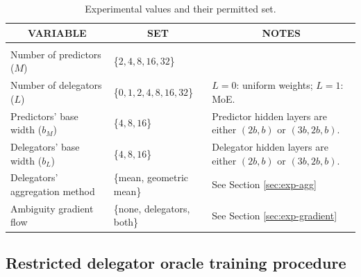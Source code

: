 \documentclass[10pt]{article} %
\begin{document}
\begin{table}[t]
\caption{Experimental values and their permitted set.}
\label{tab:experiment-parameters}
\begin{center}
\begin{tabular}{lll}
\multicolumn{1}{c}{\bf VARIABLE}
&
\multicolumn{1}{c}{\bf SET}
&
\multicolumn{1}{c}{\bf NOTES}
\\ \hline \\
Number of predictors ($M$) & \{$2, 4, 8, 16, 32$\} &  \\
Number of delegators ($L$) & \{$0, 1, 2, 4, 8, 16, 32$\} &  $L=0$: uniform weights; $L=1$: MoE. \\
Predictors' base width ($b_M$) & \{$4, 8, 16$\} & Predictor hidden layers are either $(2b,b)$ or $(3b,2b,b)$.  \\
Delegators' base width ($b_L$) & \{$4, 8, 16$\} & Delegator hidden layers are either $(2b,b)$ or $(3b,2b,b)$. \\
Delegators' aggregation method & \{mean, geometric mean\} & See Section \ref{sec:exp-agg} \\
Ambiguity gradient flow & \{none, delegators, both\} & See Section \ref{sec:exp-gradient} \\
\end{tabular}
\end{center}
\end{table}



\subsection{Restricted delegator oracle training procedure} \label{ap:restricted-oracle}
\end{document}
